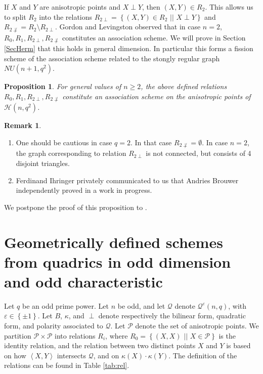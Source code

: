 \documentclass[a4paper]{article}
\newtheorem{prop}[thm]{Proposition}
\theoremstyle{definition}
\newtheorem{rmk}[thm]{Remark}
\newcommand{\eps}{\varepsilon}
\newcommand{\vspan}[1]{\left \langle #1 \right \rangle}
\newcommand{\set}[1]{ \left \{ #1 \right \} }
\newcommand{\sett}[2]{ \left\{ #1 \, \, || \, \, #2 \right \} }
\newcommand{\pp}{\mathcal P}
\newcommand{\mq}{\mathcal Q}
\newcommand{\mh}{\mathcal H}
\newcommand{\sam}[1]{\textcolor{purple}{#1}}
\begin{document}
If $X$ and $Y$ are anisotropic points and $X \perp Y$, then $(X,Y) \in R_2$.
This allows us to split $R_2$ into the relations $R_{2\perp} = \sett{(X,Y) \in R_2}{X \perp Y}$ and $R_{2\not\perp} = R_2 \setminus R_{2\perp}$.
Gordon and Levingston \cite[p.\ 264]{gordonlevingston} observed that in case $n=2$, $R_0,R_1,R_{2\perp},R_{2\not\perp}$ constitutes an association scheme.
We will prove in Section \ref{SecHerm} that this holds in general dimension.
In particular this forms a fission scheme of the association scheme related to the stongly regular graph $NU(n+1,q^2)$.

\begin{prop} \label{Prop:FissionHerm}
 For general values of $n \geq 2$, the above defined relations $R_0, R_1, R_{2\perp}, R_{2 \not\perp}$ constitute an association scheme on the anisotropic points of $\mh(n,q^2)$.
\end{prop}

\begin{rmk}
 \label{Rmk:HermOrtho}
 \begin{enumerate}
  \item \label{Rmk:HermOrtho:Q=2} One should be cautious in case $q=2$.
 In that case $R_{2 \not \perp} = \emptyset$.
 In case $n = 2$, the graph corresponding to relation $R_{2\perp}$ is not connected, but consists of 4 disjoint triangles.
  \item \label{Rmak:HermOrtho:Brouwer} Ferdinand Ihringer privately communicated to us that Andries Brouwer independently proved  in a work in progress.
 \end{enumerate}
\end{rmk}

We postpone the proof of this proposition to .

%

\section{Geometrically defined schemes from quadrics in odd dimension and odd characteristic}
 \label{Sec:NewScheme}

Let $q$ be an odd prime power.
Let $n$ be odd, and let $\mq$ denote $\mq^\eps(n,q)$, with $\eps \in \set{\pm 1}$.
Let $B$, $\kappa$, and $\perp$ denote respectively the bilinear form, quadratic form, and polarity associated to $\mq$.
Let $\pp$ denote the set of anisotropic points.
We partition $\pp \times \pp$ into relations $R_i$, where $R_0 = \sett{(X,X)}{X \in \pp}$ is the identity relation, and the relation between two distinct points $X$ and $Y$ is based on how $\vspan{X,Y}$ intersects $\mq$, and on $\kappa(X) \cdot \kappa(Y)$.
The definition of the relations can be found in Table \ref{tab:rel}.
\end{document}
